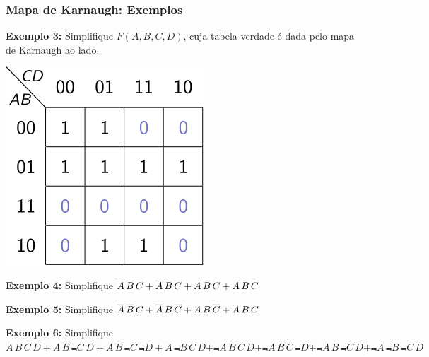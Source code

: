 \documentclass{beamer}
\begin{document}
\begin{frame}
\frametitle{Mapa de Karnaugh: Exemplos}

\begin{minipage}{38ex}
\raggedright
\textbf{Exemplo 3: } Simplifique $F(A,B,C,D)$,
cuja tabela verdade é dada pelo mapa de Karnaugh
ao lado.\\[24pt]
\end{minipage}
\begin{minipage}{30ex}
\includegraphics{images/kmap05}
\end{minipage}

\vspace{12pt}\pause\pause

\textbf{Exemplo 4: } Simplifique $\overline{A} \, \overline{B} \, \overline{C} + \overline{A} \, \overline{B} \, C + A \, B \, \overline{C} + A \, \overline{B} \, \overline{C}$

\vspace{12pt}\pause

\textbf{Exemplo 5: } Simplifique $\overline{A} \, \overline{B} \, C + \overline{A} \, B \, \overline{C} + A \, B \, \overline{C} + A \, B \, C$

\vspace{12pt}\pause

\textbf{Exemplo 6: } Simplifique $A \, B \, C \, D  +
A \, B \, \Not{C} \, D  +  A \, B \, \Not{C} \, \Not{D}  +
A \, \Not{B} \, C \, D  +  \Not{A} \, B \, C \, D  +
\Not{A} \, B \, C \, \Not{D} + \Not{A} \, B \, \Not{C} \, D  +
\Not{A} \, \Not{B} \, \Not{C} \, D$
\end{frame}
\end{document}

